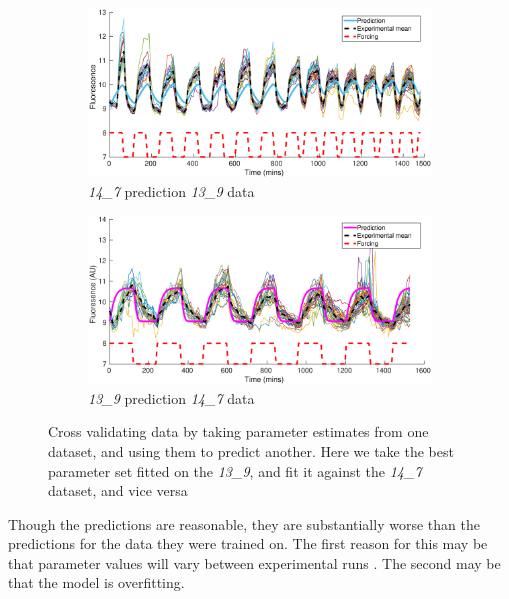 \documentclass[10pt,journal]{./IEEE_latex_class/IEEEtran}
\begin{document}
 \begin{figure}[h!]	
	\begin{subfigure}[h]{0.49\textwidth}
    \centering
        \includegraphics[scale = 0.3,clip = true, trim = 87 0 70 0]{14_7_pred_13_9_data}
        \caption{\textit{14\_7} prediction \textit{13\_9} data}
        \label{SensitivityMatrix_unscaled} 
    \end{subfigure}
    \begin{subfigure}[h]{0.49\textwidth}
    \centering
        \includegraphics[scale = 0.3,clip = true, trim = 87 0 70 0]{13_9_pred_14_7_data}
        \caption{\textit{13\_9} prediction \textit{14\_7} data}
                \label{SensitivityMatrix_scaled} 
    \end{subfigure}
    \caption{Cross validating data by taking parameter estimates from one dataset, and using them to predict another. Here we take the best parameter set fitted on the \textit{13\_9}, and fit it against the \textit{14\_7} dataset, and vice versa } 
\label{CrossValidation}   
\end{figure}

Though the predictions are reasonable, they are substantially worse than the predictions for the data they were trained on. The first reason for this may be that parameter values will vary between experimental runs \cite{Hu2015}. The second may be that the model is overfitting.
 
\end{document}
